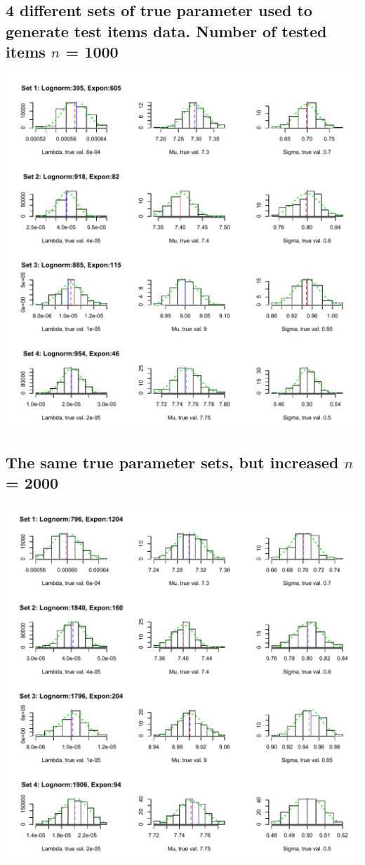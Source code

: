 \documentclass{article}
\begin{document}
\subsection{4 different sets of true parameter used to generate test items data. Number of tested items $n$ = 1000}
\includegraphics{Diagram1.pdf}
\subsection{The same true parameter sets, but increased $n$ = 2000}
\includegraphics{Diagram2.pdf}
\end{document}
